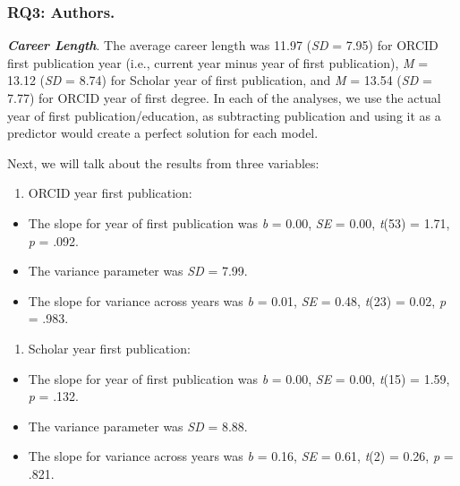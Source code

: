 \documentclass[
  english,
  man]{apa6}
\providecommand{\tightlist}{%
  \setlength{\itemsep}{0pt}\setlength{\parskip}{0pt}}
\begin{document}
\hypertarget{rq3-authors.-1}{%
\subsubsection{\texorpdfstring{RQ3: Authors.\\
}{RQ3: Authors. }}\label{rq3-authors.-1}}

\textbf{\emph{Career Length}}. The average career length was 11.97 (\emph{SD} = 7.95) for ORCID first publication year (i.e., current year minus year of first publication), \emph{M} = 13.12 (\emph{SD} = 8.74) for Scholar year of first publication, and \emph{M} = 13.54 (\emph{SD} = 7.77) for ORCID year of first degree. In each of the analyses, we use the actual year of first publication/education, as subtracting publication and using it as a predictor would create a perfect solution for each model.

Next, we will talk about the results from three variables:

\begin{enumerate}
\def\labelenumi{\arabic{enumi})}
\tightlist
\item
  ORCID year first publication:
\end{enumerate}

\begin{itemize}
\tightlist
\item
  The slope for year of first publication was \emph{b} = 0.00, \emph{SE} = 0.00, \emph{t}(53) = 1.71, \emph{p} = .092.
\item
  The variance parameter was \emph{SD} = 7.99.
\item
  The slope for variance across years was \emph{b} = 0.01, \emph{SE} = 0.48, \emph{t}(23) = 0.02, \emph{p} = .983.
\end{itemize}

\begin{enumerate}
\def\labelenumi{\arabic{enumi})}
\setcounter{enumi}{1}
\tightlist
\item
  Scholar year first publication:
\end{enumerate}

\begin{itemize}
\tightlist
\item
  The slope for year of first publication was \emph{b} = 0.00, \emph{SE} = 0.00, \emph{t}(15) = 1.59, \emph{p} = .132.
\item
  The variance parameter was \emph{SD} = 8.88.
\item
  The slope for variance across years was \emph{b} = 0.16, \emph{SE} = 0.61, \emph{t}(2) = 0.26, \emph{p} = .821.
\end{itemize}
\end{document}
